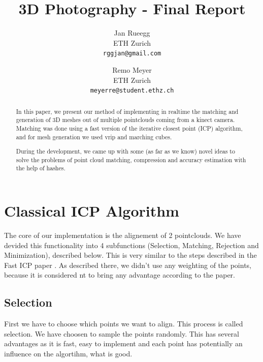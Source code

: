 \documentclass[10pt,twocolumn,letterpaper]{article}
\begin{document}
\title{3D Photography - Final Report}

\author{Jan Rueegg\\
ETH Zurich\\
{\tt\small rggjan@gmail.com}
\and
Remo Meyer\\
ETH Zurich\\
{\tt\small meyerre@student.ethz.ch}
}

\maketitle
\thispagestyle{empty}

\begin{abstract}
In this paper, we present our method of implementing in realtime the matching and generation of 3D meshes out of multiple pointclouds coming from a kinect
camera. Matching was done using a fast version of the iterative closest point (ICP) algorithm, and for mesh generation we used vrip and marching cubes.

During the development, we came up with some (as far as we know) novel ideas to solve the problems of point cloud matching, compression and accuracy
estimation with the help of hashes.
\end{abstract}

\section{Classical ICP Algorithm}
The core of our implementation is the alignement of 2 pointclouds. 
We have devided this functionality into 4 subfunctions (Selection, Matching, Rejection and Minimization), described below. This is very
similar to the steps described in the Fast ICP paper \cite{fasticp}. As described there, we didn't use any weighting of the points,
because it is considered nt to bring any advantage according to the paper.

\subsection{Selection}
First we have to choose which points we want to align. This process is called selection. 
We have choosen to sample the points randomly. 
This has several advantages as it is fast, easy to implement and each point has potentially an influence on the algortihm, what is good.
\end{document}
